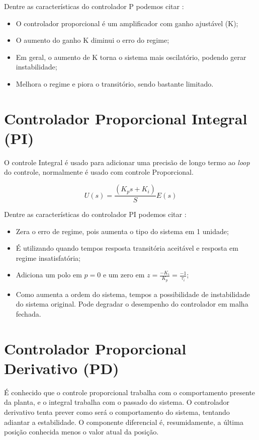 \documentclass[
	12pt,				%
	openany,			%
	oneside,			%
	a4paper,			%
	english,			%
	french,				%
	spanish,			%
	brazil,				%
	]{abntex2}
\begin{document}
{Dentre as características do controlador P podemos citar \cite{meneghetti1}:

\begin{itemize}
    \item O controlador proporcional é um amplificador com ganho ajustável (K);
    \item O aumento do ganho K diminui o erro do regime;
    \item Em geral, o aumento de K torna o sistema mais oscilatório, podendo gerar instabilidade;
    \item Melhora o regime e piora o transitório, sendo bastante limitado.
\end{itemize}


\section{Controlador Proporcional Integral (PI)}

O controle Integral é usado para adicionar uma precisão de longo termo ao \textit{loop} do controle, normalmente é usado com controle Proporcional. 

\begin{equation}
U(s) = \frac{(K_ps+K_i)}{S}E(s)
\end{equation}

Dentre as características do controlador PI podemos citar \cite{meneghetti1}:
\begin{itemize}
    \item Zera o erro de regime, pois aumenta o tipo do sistema em 1 unidade;
    \item É utilizando quando tempos resposta transitória aceitável e resposta em regime insatisfatória;
    \item Adiciona um polo em $p=0$ e um zero em $z = \frac{-K_i}{K_p} = \frac{-1}{\tau_i}$;
    \item Como aumenta a ordem do sistema, tempos a possibilidade de instabilidade do sistema original. Pode degradar o desempenho do controlador em malha fechada.
\end{itemize}

\section{Controlador Proporcional Derivativo (PD)}

É conhecido que o controle proporcional trabalha com o comportamento presente da planta, e o integral trabalha com o passado do sistema. O controlador derivativo tenta prever como será o comportamento do sistema, tentando adiantar a estabilidade. O componente diferencial é, resumidamente, a última posição conhecida menos o valor atual da posição.

}
\end{document}

